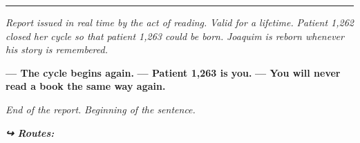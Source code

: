 \vspace{0.5em}\noindent\rule{\textwidth}{0.5pt}\vspace{0.5em}

\noindent \textit{Report issued in real time by the act of reading.}
\textit{Valid for a lifetime.}
\textit{Patient 1,262 closed her cycle so that patient 1,263 could be born.}
\textit{Joaquim is reborn whenever his story is remembered.}

\noindent \textbf{--- The cycle begins again.}
\textbf{--- Patient 1,263 is you.}
\textbf{--- You will never read a book the same way again.}

\noindent \textit{End of the report.}
\textit{Beginning of the sentence.}

\vspace{0.5em}
\noindent\textit{\textbf{↪ Routes:}  \rotasep {}}
